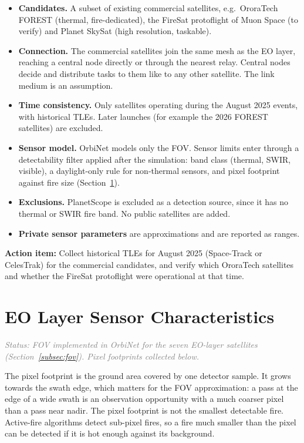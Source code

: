 \documentclass[11pt]{article}
\newcommand{\actionitem}[1]{\textcolor{todo}{\textbf{Action item:}} #1}
\newcommand{\status}[1]{\textit{\textcolor{gray}{Status: #1}}}
\begin{document}
\begin{itemize}[leftmargin=1.2cm]
    \item \textbf{Candidates.} A subset of existing commercial satellites, e.g.\ OroraTech FOREST (thermal, fire-dedicated), the FireSat protoflight of Muon Space (to verify) and Planet SkySat (high resolution, taskable).
    \item \textbf{Connection.} The commercial satellites join the same mesh as the EO layer, reaching a central node directly or through the nearest relay. Central nodes decide and distribute tasks to them like to any other satellite. The link medium is an assumption.
    \item \textbf{Time consistency.} Only satellites operating during the August 2025 events, with historical TLEs. Later launches (for example the 2026 FOREST satellites) are excluded.
    \item \textbf{Sensor model.} OrbiNet models only the FOV. Sensor limits enter through a detectability filter applied after the simulation: band class (thermal, SWIR, visible), a daylight-only rule for non-thermal sensors, and pixel footprint against fire size (Section~\ref{sec:sensors}).
    \item \textbf{Exclusions.} PlanetScope is excluded as a detection source, since it has no thermal or SWIR fire band. No public satellites are added.
    \item \textbf{Private sensor parameters} are approximations and are reported as ranges.
\end{itemize}

\actionitem{Collect historical TLEs for August 2025 (Space-Track or CelesTrak) for the commercial candidates, and verify which OroraTech satellites and whether the FireSat protoflight were operational at that time.}

\section{EO Layer Sensor Characteristics}\label{sec:sensors}

\status{FOV implemented in OrbiNet for the seven EO-layer satellites (Section~\ref{subsec:fov}). Pixel footprints collected below.}

The pixel footprint is the ground area covered by one detector sample. It grows towards the swath edge, which matters for the FOV approximation: a pass at the edge of a wide swath is an observation opportunity with a much coarser pixel than a pass near nadir. The pixel footprint is not the smallest detectable fire. Active-fire algorithms detect sub-pixel fires, so a fire much smaller than the pixel can be detected if it is hot enough against its background.
\end{document}
